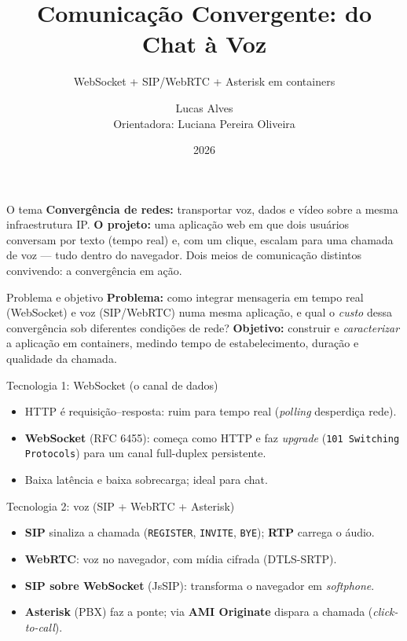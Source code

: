 \documentclass[aspectratio=169]{beamer}
\title[Comunicação Convergente]{Comunicação Convergente: do Chat à Voz}
\subtitle{WebSocket + SIP/WebRTC + Asterisk em containers}
\author[Lucas Alves]{Lucas Alves \\ \small Orientadora: Luciana Pereira Oliveira}
\institute[IFPB]{Redes Convergentes --- IFPB}
\date{2026}
\begin{document}
\begin{frame}
  \titlepage
\end{frame}

\begin{frame}{O tema}
  \textbf{Convergência de redes:} transportar voz, dados e vídeo sobre a mesma
  infraestrutura IP.
  \vfill
  \textbf{O projeto:} uma aplicação web em que dois usuários conversam por
  \alert{texto} (tempo real) e, com um clique, \alert{escalam} para uma chamada de
  \alert{voz} --- tudo dentro do navegador.
  \vfill
  Dois meios de comunicação distintos convivendo: a convergência em ação.
\end{frame}

\begin{frame}{Problema e objetivo}
  \textbf{Problema:} como integrar mensageria em tempo real (WebSocket) e voz
  (SIP/WebRTC) numa mesma aplicação, e qual o \emph{custo} dessa convergência sob
  diferentes condições de rede?
  \vfill
  \textbf{Objetivo:} construir e \emph{caracterizar} a aplicação em containers,
  medindo tempo de estabelecimento, duração e qualidade da chamada.
\end{frame}

\begin{frame}[fragile]{Tecnologia 1: WebSocket (o canal de dados)}
  \begin{itemize}
    \item HTTP é requisição--resposta: ruim para tempo real (\emph{polling} desperdiça rede).
    \item \textbf{WebSocket} (RFC 6455): começa como HTTP e faz \emph{upgrade}
      (\verb|101 Switching Protocols|) para um canal \alert{full-duplex} persistente.
    \item Baixa latência e baixa sobrecarga; ideal para \alert{chat}.
  \end{itemize}
\end{frame}

\begin{frame}[fragile]{Tecnologia 2: voz (SIP + WebRTC + Asterisk)}
  \begin{itemize}
    \item \textbf{SIP} sinaliza a chamada (\verb|REGISTER|, \verb|INVITE|, \verb|BYE|);
      \textbf{RTP} carrega o áudio.
    \item \textbf{WebRTC}: voz no navegador, com mídia cifrada (DTLS-SRTP).
    \item \textbf{SIP sobre WebSocket} (JsSIP): transforma o navegador em \emph{softphone}.
    \item \textbf{Asterisk} (PBX) faz a ponte; via \textbf{AMI Originate} dispara a
      chamada (\emph{click-to-call}).
  \end{itemize}
\end{frame}
\end{document}
